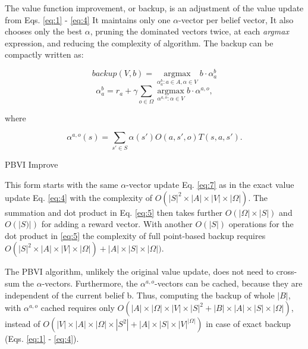 The value function improvement, or backup, is an adjustment of the value update from Eqs. \ref{eq:1} - \ref{eq:4} It maintains only one $\alpha$-vector per belief vector, It also chooses only the best $\alpha$, pruning the dominated vectors twice, at each \textit{argmax} expression, and reducing the complexity of algorithm. The backup can be compactly written as:

\begin{equation} \label{eq:5} backup(V, b) = \operatorname*{argmax}_{\alpha_{a}^{b}:a \in A, \alpha \in V} b \cdot \alpha_{a}^{b}\end{equation}
\begin{equation} \label{eq:6} \alpha_{a}^{b} = r_a + \gamma \sum_{o \in \Omega} \operatorname*{argmax}_{\alpha^{a, o}:\alpha \in V} b \cdot \alpha^{a, o},\end{equation}

where

\begin{equation} \label{eq:7} \alpha^{a, o} (s) = \sum_{s' \in S} \alpha (s') O (a, s', o) T(s, a, s').\end{equation}

\LinesNumbered
\begin{algorithm}[H]
\SetAlgoLined
{}
\caption{PBVI Improve}
\end{algorithm}


This form starts with the same $\alpha$-vector update Eq. \ref{eq:7} as in the exact value update Eq. \ref{eq:4} with the complexity of $O(|S|^2 \times |A| \times |V| \times |\Omega|)$. The summation and dot product in Eq. \ref{eq:5} then takes further $O(|\Omega| \times |S|)$ and $O(|S)|)$ for adding a reward vector. With another $O(|S|)$ operations for the dot product in \ref{eq:5} the complexity of full point-based backup requires $O(|S|^2 \times |A| \times |V| \times |\Omega|) + |A| \times |S| \times |\Omega|)$.

The PBVI algorithm, unlikely the original value update, does not need to cross-sum the $\alpha$-vectors. Furthermore, the $\alpha^{a, o}$-vectors can be cached, because they are independent of the current belief b. Thus, computing the backup of whole $|B|$, with $\alpha^{a, o}$ cached requires only $O(|A| \times |\Omega| \times |V| \times |S|^2 +
|B|\times|A|\times|S|\times|\Omega|)$, instead of $O(|V| \times |A| \times |\Omega| \times |S^2| + |A| \times |S| \times |V|^{|\Omega|})$ in case of exact backup (Eqs. \ref{eq:1} - \ref{eq:4}).



